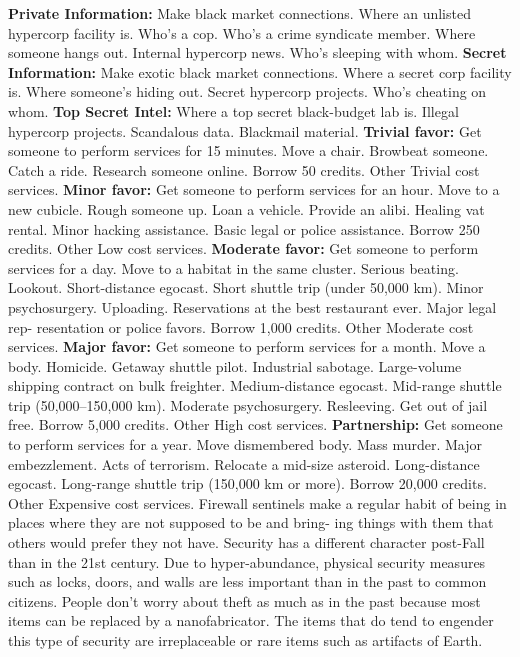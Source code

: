 \textbf{Private Information:} Make black market connections. 
Where an unlisted hypercorp facility is. Who's a cop. Who's 
a crime syndicate member. Where someone hangs out. 
Internal hypercorp news. Who's sleeping with whom.
\textbf{Secret Information:} Make exotic black market 
connections. Where a secret corp facility is. Where 
someone's hiding out. Secret hypercorp projects. Who's 
cheating on whom.
\textbf{Top Secret Intel: }Where a top secret black-budget 
lab is. Illegal hypercorp projects. Scandalous data. 
Blackmail material.
\textbf{Trivial favor:} Get someone to perform services for 15 
minutes. Move a chair. Browbeat someone. Catch a ride. 
Research someone online. Borrow 50 credits. Other Trivial 
cost services.
\textbf{Minor favor:} Get someone to perform services for an 
hour. Move to a new cubicle. Rough someone up. Loan a 
vehicle. Provide an alibi. Healing vat rental. Minor hacking 
assistance. Basic legal or police assistance. Borrow 250 
credits. Other Low cost services.
\textbf{Moderate favor:} Get someone to perform services 
for a day. Move to a habitat in the same cluster. Serious 
beating. Lookout. Short-distance egocast. Short shuttle 
trip (under 50,000 km). Minor psychosurgery. Uploading. 
Reservations at the best restaurant ever. Major legal rep-
resentation or police favors. Borrow 1,000 credits. Other 
Moderate cost services.
\textbf{Major favor:} Get someone to perform services for a 
month. Move a body. Homicide. Getaway shuttle pilot. 
Industrial sabotage. Large-volume shipping contract on 
bulk freighter. Medium-distance egocast. Mid-range shuttle 
trip (50,000–150,000 km). Moderate psychosurgery. 
Resleeving. Get out of jail free. Borrow 5,000 credits. Other 
High cost services.
\textbf{Partnership:} Get someone to perform services for a 
year. Move dismembered body. Mass murder. Major 
embezzlement. Acts of terrorism. Relocate a mid-size 
asteroid. Long-distance egocast. Long-range shuttle trip 
(150,000 km or more). Borrow 20,000 credits. Other 
Expensive cost services.
Firewall sentinels make a regular habit of being in 
places where they are not supposed to be and bring-
ing things with them that others would prefer they 
not have. Security has a different character post-Fall 
than in the 21st century. Due to hyper-abundance, 
physical security measures such as locks, doors, and 
walls are less important than in the past to common 
citizens. People don't worry about theft as much as 
in the past because most items can be replaced by a 
nanofabricator. The items that do tend to engender 
this type of security are irreplaceable or rare items 
such as artifacts of Earth.

